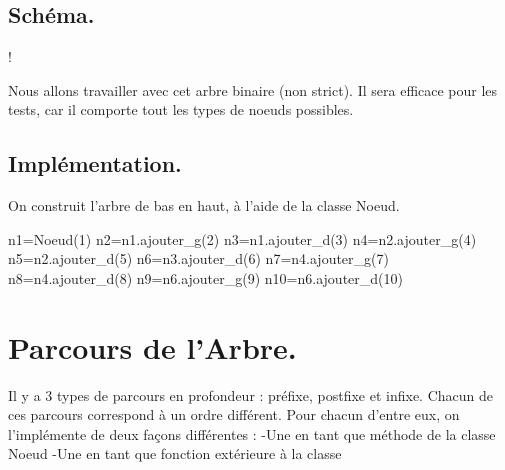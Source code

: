 \documentclass{article}
\begin{document}
\subsection{Schéma.}
\begin{center}
\resizebox {\textwidth} {!} {

 }
\end{center}
Nous allons travailler avec cet arbre binaire (non strict). Il sera efficace pour les tests, car il 
comporte tout les types de noeuds possibles.
\subsection{Implémentation.}
On construit l'arbre de bas en haut, à l'aide de la classe Noeud.
\begin{python}
    n1=Noeud(1)
    n2=n1.ajouter_g(2)
    n3=n1.ajouter_d(3)
    n4=n2.ajouter_g(4)
    n5=n2.ajouter_d(5)
    n6=n3.ajouter_d(6)
    n7=n4.ajouter_g(7)
    n8=n4.ajouter_d(8)
    n9=n6.ajouter_g(9)
    n10=n6.ajouter_d(10)
\end{python}

\newpage
\section{Parcours de l'Arbre.}
 Il y a 3 types de parcours en profondeur : préfixe, postfixe et infixe.
 Chacun de ces parcours correspond à un ordre différent.
 Pour chacun d'entre eux, on l'implémente de deux façons différentes :
 \newline
 -Une en tant que méthode de la classe Noeud
 \newline
 -Une en tant que fonction extérieure à la classe
\end{document}
